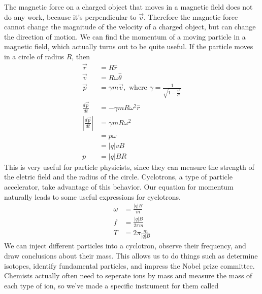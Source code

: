 \documentclass[nobib]{tufte-handout}
\begin{document}
The magnetic force on a charged object that moves in a
magnetic field does not do any work, because it's
perpendicular to $\vec{v}$.
Therefore the magnetic force cannot change the magnitude of the
velocity of a charged object, but can change the direction
of motion. 
We can find the momentum of a moving particle in a magnetic field, which actually turns 
out to be quite useful. If the particle moves in a circle of radius $R$, then 
\begin{align*}
    \vec{r} &= R\hat{r} \\
    \vec{v} &= R\omega\hat{\theta} \\
    \vec{p} &= \gamma m \vec{v}, \text{ where } \gamma = \frac{1}{\sqrt{1-\frac{v^2}{c^2}}} \\
    \frac{d\vec{p}}{dt} &= -\gamma mR\omega^2\hat{r} \\
    |\frac{d\vec{p}}{dt}| &= \gamma mR\omega^2 \\
    &= p\omega \\
    &= |q|vB \\
    p &= |q|BR
\end{align*}
This is very useful for particle physicists, 
since they can measure the strength of the 
eletric field and the radius of the circle. 
Cyclotrons, a type of particle accelerator, 
take advantage of this behavior. Our equation for 
momentum naturally leads to some useful 
expressions for cyclotrons. 
\begin{align*}
    \omega &= \frac{|q|B}{m} \\
    f &= \frac{|q|B}{2\pi m} \\
    T &= 2\pi \frac{m}{|q|B}
\end{align*}
We can inject different particles into 
a cyclotron, observe their frequency, and 
draw conclusions about their mass. 
This allows us to do things such as 
determine isotopes, identify fundamental 
particles, and impress the Nobel prize committee. 
Chemists actually often need to seperate ions 
by mass and measure the mass of each type of ion, 
so we've made a specific instrument for them called 
\end{document}
